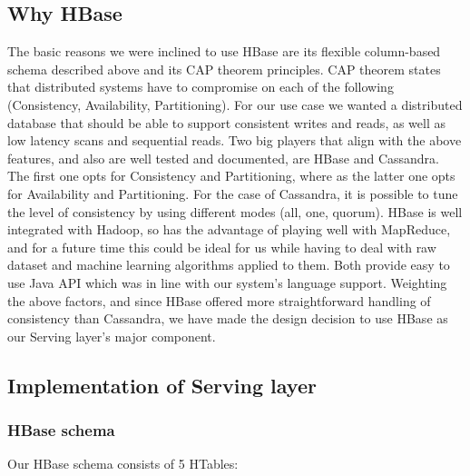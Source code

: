 \documentclass{lmproj}
\begin{document}
\subsection{Why HBase}

The basic reasons we were inclined to use HBase are its flexible column-based schema described above and its CAP theorem principles. CAP theorem states that distributed systems have to compromise on each of the following (Consistency, Availability, Partitioning). For our use case we wanted a distributed database that should be able to support consistent writes and reads, as well as low latency scans and sequential reads. Two big players that align with the above features, and also are well tested and documented, are HBase and Cassandra. The first one opts for Consistency and Partitioning, where as the latter one opts for Availability and Partitioning. For the case of Cassandra, it is possible to tune the level of consistency by using different modes (all, one, quorum). HBase is well integrated with Hadoop, so has the advantage of playing well with MapReduce, and for a future time this could be ideal for us while having to deal with raw dataset and machine learning algorithms applied to them. Both provide easy to use Java API which was in line with our system's language support. Weighting the above factors, and since HBase offered more straightforward handling of consistency than Cassandra, we have made the design decision to use HBase as our Serving layer's major component. 


\subsection{Implementation of Serving layer}


\subsubsection{HBase schema}
Our HBase schema consists of 5 HTables:
\end{document}
